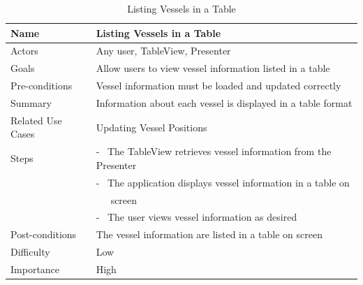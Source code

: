 \documentclass[12pt]{article}
\begin{document}
\begin{table}[ht]
\centering
   \begin{tabular}{|l|l|}
        \hline
        {\large Name} & {\large Listing Vessels in a Table} \\
        \hline\hline
        Actors & Any user, TableView, Presenter\\
        \hline
        Goals & Allow users to view vessel information listed in a         table\\
        \hline
        Pre-conditions & Vessel information must be loaded and updated correctly\\
        \hline
        Summary & Information about each vessel is displayed in a table format\\
        \hline
        Related Use Cases & Updating Vessel Positions\\
        \hline
        Steps & - \ The TableView retrieves vessel information from the Presenter\\
         & - \ The application displays vessel information in a table on\\
          & \ \ \ screen\\
          & - \ The user views vessel information as desired\\
        \hline
        Post-conditions & The vessel information are listed in a table on screen\\
        \hline
        Difficulty & Low\\
        \hline
        Importance & High\\
        \hline
    \end{tabular}
\caption{Listing Vessels in a Table}
\end{table}
\end{document}
